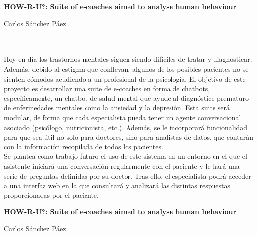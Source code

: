 
\cleardoublepage
\thispagestyle{empty}

\begin{center}
{\large\bfseries  HOW-R-U?: Suite of e-coaches aimed to analyse human behaviour}\\
\end{center}
\begin{center}
Carlos Sánchez Páez\\
\end{center}

\\

\vspace{0.7cm}
\\

Hoy en día los trastornos mentales siguen siendo difíciles de tratar y diagnosticar. Además, debido al estigma que conllevan, algunos de los posibles pacientes no se sienten cómodos acudiendo a un profesional de la psicología. El objetivo de este proyecto es desarrollar una suite de e-coaches en forma de chatbots, específicamente, un chatbot de salud mental que ayude al diagnóstico prematuro de enfermedades mentales como la ansiedad y la depresión. Esta suite será modular, de forma que cada especialista pueda tener un agente conversacional asociado (psicólogo, nutricionista, etc.). Además, se le incorporará funcionalidad para que sea útil no solo para doctores, sino para analistas de datos, que contarán con la información recopilada de todos los pacientes.\\

Se plantea como trabajo futuro el uso de este sistema en un entorno en el que el asistente iniciará una conversación regularmente con el paciente y le hará una serie de preguntas definidas por su doctor. Tras ello, el especialista podrá acceder a una interfaz web en la que consultará y analizará las distintas respuestas proporcionadas por el paciente.
\cleardoublepage


\thispagestyle{empty}


\begin{center}
{\large\bfseries HOW-R-U?: Suite of e-coaches aimed to analyse human behaviour}\\
\end{center}
\begin{center}
Carlos Sánchez Páez\\
\end{center}

